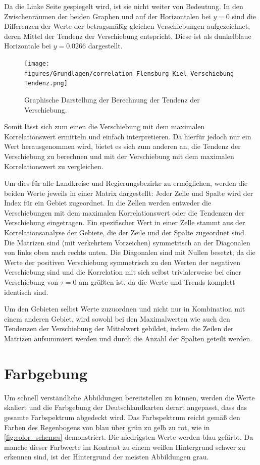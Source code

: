 Da die Linke Seite gespiegelt wird, ist sie nicht weiter von Bedeutung. In den Zwischenräumen der beiden Graphen und auf der Horizontalen bei $y=0$ sind die Differenzen der Werte der betragsmäßig gleichen Verschiebungen aufgezeichnet, deren Mittel der Tendenz der Verschiebung entspricht. Diese ist als dunkelblaue Horizontale bei $y=0.0266$ dargestellt.

\begin{figure}[H]
    \centering
    \texttt{[image: figures/Grundlagen/correlation\_Flensburg\_Kiel\_Verschiebung\_Tendenz.png]}
    \caption{Graphische Darstellung der Berechnung der Tendenz der Verschiebung.}
    \label{fig:Flensburg_Kiel_Verschiebung_Tendenz}
\end{figure}

Somit lässt sich zum einen die Verschiebung mit dem maximalen Korrelationswert ermitteln und einfach interpretieren.
Da hierfür jedoch nur ein Wert herausgenommen wird, bietet es sich zum anderen an, die Tendenz der Verschiebung zu berechnen und mit der Verschiebung mit dem maximalen Korrelationswert zu vergleichen.



Um dies für alle Landkreise und Regierungsbezirke zu ermöglichen, werden die beiden Werte jeweils in einer Matrix dargestellt: Jeder Zeile und Spalte wird der Index für ein Gebiet zugeordnet. In die Zellen werden entweder die Verschiebungen mit dem maximalen Korrelationswert oder die Tendenzen der Verschiebung eingetragen. Ein spezifischer Wert in einer Zelle stammt aus der Korrelationsanalyse der Gebiete, die der Zeile und der Spalte zugeordnet sind.
Die Matrizen sind (mit verkehrtem Vorzeichen) symmetrisch an der Diagonalen von links oben nach rechts unten. Die Diagonalen sind mit Nullen besetzt, da die Werte der positiven Verschiebung symmetrisch zu den Werten der negativen Verschiebung sind und die Korrelation mit sich selbst trivialerweise bei einer Verschiebung von $\tau=0$ am größten ist, da die Werte und Trends komplett identisch sind.

Um den Gebieten selbst Werte zuzuordnen und nicht nur in Kombination mit einem anderen Gebiet, wird sowohl bei den Maximalwerten wie auch den Tendenzen der Verschiebung der Mittelwert gebildet, indem die Zeilen der Matrizen aufsummiert werden und durch die Anzahl der Spalten geteilt werden.
\section{Farbgebung}\label{sec:Grundlagen:Farbgebung}
Um schnell verständliche Abbildungen bereitstellen zu können, werden die Werte skaliert und die Farbgebung der Deutschlandkarten derart angepasst, dass das gesamte Farbspektrum abgedeckt wird. Das Farbspektrum reicht gemäß den Farben des Regenbogens von blau über grün zu gelb zu rot, wie in \autoref{fig:color_schemes} demonstriert. Die niedrigsten Werte werden blau gefärbt.
Da manche dieser Farbwerte im Kontrast zu einem weißen Hintergrund schwer zu erkennen sind, ist der Hintergrund der meisten Abbildungen grau.

